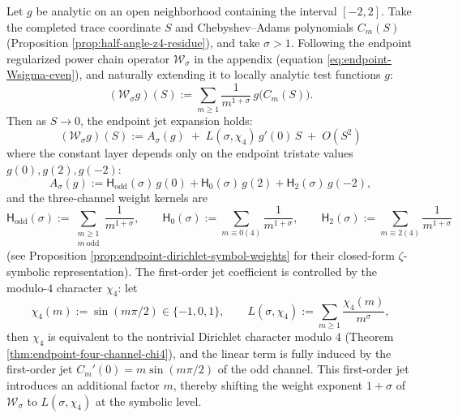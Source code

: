 \begin{theorem}\label{thm:xi-endpoint-two-symbol-jet}
Let \(g\) be analytic on an open neighborhood containing the interval \([-2,2]\).
Take the completed trace coordinate \(S\) and Chebyshev--Adams polynomials \(C_m(S)\) (Proposition \ref{prop:half-angle-z4-residue}), and take \(\sigma>1\).
Following the endpoint regularized power chain operator \(\mathcal W_\sigma\) in the appendix (equation \eqref{eq:endpoint-Wsigma-even}), and naturally extending it to locally analytic test functions \(g\):
\[
(\mathcal W_\sigma g)(S):=\sum_{m\ge 1}\frac{1}{m^{1+\sigma}}\,g\!\bigl(C_m(S)\bigr).
\]
Then as \(S\to 0\), the endpoint jet expansion holds:
\begin{equation}\label{eq:xi-endpoint-two-symbol-jet}
\boxed{\;
(\mathcal W_\sigma g)(S)
:=A_\sigma(g)\;+\;L(\sigma,\chi_4)\,g'(0)\,S\;+\;O(S^2)\;}
\end{equation}
where the constant layer depends only on the endpoint tristate values \(g(0),g(2),g(-2)\):
\[
A_\sigma(g):=\mathsf H_{\mathrm{odd}}(\sigma)\,g(0)+\mathsf H_{0}(\sigma)\,g(2)+\mathsf H_{2}(\sigma)\,g(-2),
\]
and the three-channel weight kernels are
\[
\mathsf H_{\mathrm{odd}}(\sigma):=\sum_{\substack{m\ge 1\\ m\ \text{odd}}}\frac{1}{m^{1+\sigma}},\qquad
\mathsf H_{0}(\sigma):=\sum_{m\equiv 0(4)}\frac{1}{m^{1+\sigma}},\qquad
\mathsf H_{2}(\sigma):=\sum_{m\equiv 2(4)}\frac{1}{m^{1+\sigma}}
\]
(see Proposition \ref{prop:endpoint-dirichlet-symbol-weights} for their closed-form \(\zeta\)-symbolic representation).
The first-order jet coefficient is controlled by the modulo-\(4\) character \(\chi_4\): let
\[
\chi_4(m):=\sin(m\pi/2)\in\{-1,0,1\},
\qquad
L(\sigma,\chi_4):=\sum_{m\ge 1}\frac{\chi_4(m)}{m^\sigma},
\]
then \(\chi_4\) is equivalent to the nontrivial Dirichlet character modulo \(4\) (Theorem \ref{thm:endpoint-four-channel-chi4}), and the linear term is fully induced by the first-order jet \(C_m'(0)=m\sin(m\pi/2)\) of the odd channel.
This first-order jet introduces an additional factor \(m\), thereby shifting the weight exponent \(1+\sigma\) of \(\mathcal W_\sigma\) to \(L(\sigma,\chi_4)\) at the symbolic level.
\end{theorem}

